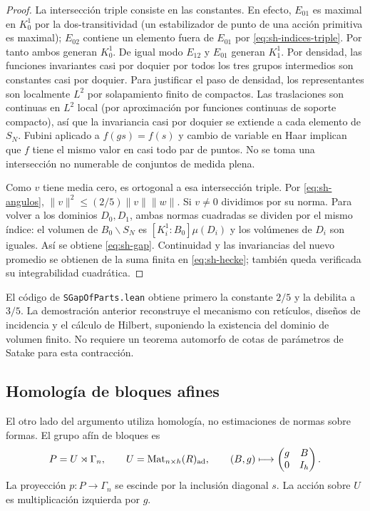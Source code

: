 \begin{proof}
La intersección triple consiste en las constantes. En efecto, $E_{01}$ es maximal en $K_0^1$ por la dos-transitividad (un estabilizador de punto de una acción primitiva es maximal); $E_{02}$ contiene un elemento fuera de $E_{01}$ por \eqref{eq:sh-indices-triple}. Por tanto ambos generan $K_0^1$. De igual modo $E_{12}$ y $E_{01}$ generan $K_1^1$. Por densidad, las funciones invariantes casi por doquier por todos los tres grupos intermedios son constantes casi por doquier. Para justificar el paso de densidad, los representantes son localmente $L^2$ por solapamiento finito de compactos. Las traslaciones son continuas en $L^2$ local (por aproximación por funciones continuas de soporte compacto), así que la invariancia casi por doquier se extiende a cada elemento de $S_N$. Fubini aplicado a $f(gs)=f(s)$ y cambio de variable en Haar implican que $f$ tiene el mismo valor en casi todo par de puntos. No se toma una intersección no numerable de conjuntos de medida plena.

Como $v$ tiene media cero, es ortogonal a esa intersección triple. Por \eqref{eq:sh-angulos}, $\|v\|^2\le(2/5)\|v\|\|w\|$. Si $v\ne0$ dividimos por su norma. Para volver a los dominios $D_0,D_1$, ambas normas cuadradas se dividen por el mismo índice: el volumen de $B_0\backslash S_N$ es $[K_i^1:B_0]\mu(D_i)$ y los volúmenes de $D_i$ son iguales. Así se obtiene \eqref{eq:sh-gap}. Continuidad y las invariancias del nuevo promedio se obtienen de la suma finita en \eqref{eq:sh-hecke}; también queda verificada su integrabilidad cuadrática.
\end{proof}

El código de \texttt{SGapOfParts.lean} obtiene primero la constante $2/5$ y la debilita a $3/5$. La demostración anterior reconstruye el mecanismo con retículos, diseños de incidencia y el cálculo de Hilbert, suponiendo la existencia del dominio de volumen finito. No requiere un teorema automorfo de cotas de parámetros de Satake para esta contracción.

\subsection{Homología de bloques afines}

El otro lado del argumento utiliza homología, no estimaciones de normas sobre formas. El grupo afín de bloques es
\[
 P=U\rtimes\Gamma_n,\qquad U=\operatorname{Mat}_{n\times h}(R)_{\rm ad},
 \qquad (B,g)\longmapsto\begin{pmatrix}g&B\\0&I_h\end{pmatrix}.
\]
La proyección $p:P\to\Gamma_n$ se escinde por la inclusión diagonal $s$. La acción sobre $U$ es multiplicación izquierda por $g$.

